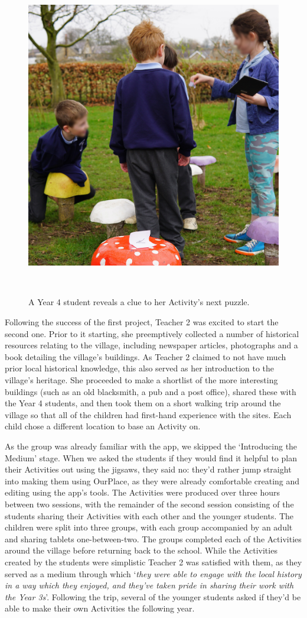 \documentclass[,hyphens]{sigchi}
\begin{document}
\begin{figure}
\centering
  \includegraphics[width=0.6\columnwidth]{figures/mushrooms}
  \caption{A Year 4 student reveals a clue to her Activity's next puzzle. }~\label{fig:Mushrooms}
\end{figure}

Following the success of the first project, Teacher 2 was excited to start the second one. Prior to it starting, she preemptively collected a number of historical resources relating to the village, including newspaper articles, photographs and a book detailing the village's buildings. As Teacher 2 claimed to not have much prior local historical knowledge, this also served as her introduction to the village's heritage. She proceeded to make a shortlist of the more interesting buildings (such as an old blacksmith, a pub and a post office), shared these with the Year 4 students, and then took them on a short walking trip around the village so that all of the children had first-hand experience with the sites. Each child chose a different location to base an Activity on.

As the group was already familiar with the app, we skipped the `Introducing the Medium' stage. When we asked the students if they would find it helpful to plan their Activities out using the jigsaws, they said no: they'd rather jump straight into making them using OurPlace, as they were already comfortable creating and editing using the app's tools. The Activities were produced over three hours between two sessions, with the remainder of the second session consisting of the students sharing their Activities with each other and the younger students. The children were split into three groups, with each group accompanied by an adult and sharing tablets one-between-two. The groups completed each of the Activities around the village before returning back to the school. While the Activities created by the students were simplistic Teacher 2 was satisfied with them, as they served as a medium through which `\textit{they were able to engage with the local history in a way which they enjoyed, and they've taken pride in sharing their work with the Year 3s}'. Following the trip, several of the younger students asked if they'd be able to make their own Activities the following year.
\end{document}
